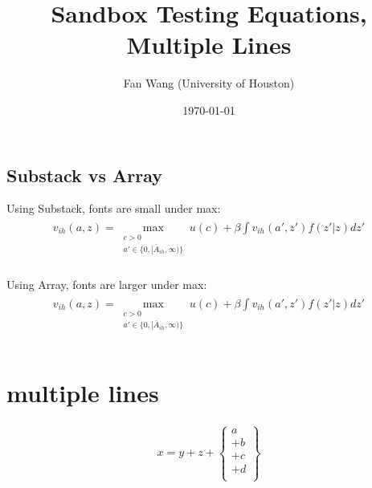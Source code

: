 \documentclass[12pt,english]{article}
\title{Sandbox Testing Equations, Multiple Lines}
\author{Fan Wang (University of Houston)}
\date{\today}
\begin{document}
\maketitle

\subsection{Substack vs Array}

Using Substack, fonts are small under max:
\begin{align}
    \begin{split}
        \label{eq:Value}
        v_{ih}\left(a,z\right)
        =
        \max_{
            \substack{
                c>0\\
                a' \in \{0,[\bar{A}_{ih},\infty)\}
                }
            }
        u\left(c\right)+  \beta \int v_{ih}\left(a',z'\right)f(z'|z)dz'\\
    \end{split}
\end{align}

Using Array, fonts are larger under max:
\begin{align}
    \begin{split}
        \label{eq:Value}
        v_{ih}\left(a,z\right)
        =
        \max_{
            \begin{array}{cc}
                c>0\\
                a' \in \{0,[\bar{A}_{ih},\infty)\}\\
            \end{array}
            }
        u\left(c\right)+  \beta \int v_{ih}\left(a',z'\right)f(z'|z)dz'\\
    \end{split}
\end{align}

\section{multiple lines}

\begin{align}
    x = y + z + 
    \left\{
      \begin{array}{l}
            a \\
            + b \\
            + c \\
            + d \\
      \end{array}
    \right\}
\end{align}
\end{document}
